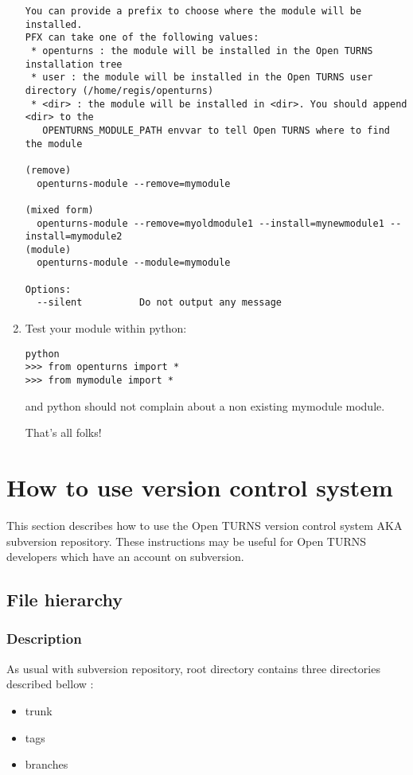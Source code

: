 \documentclass[11pt]{article}
\begin{document}
\begin{enumerate}
\begin{verbatim}
You can provide a prefix to choose where the module will be installed.
PFX can take one of the following values:
 * openturns : the module will be installed in the Open TURNS installation tree
 * user : the module will be installed in the Open TURNS user directory (/home/regis/openturns)
 * <dir> : the module will be installed in <dir>. You should append <dir> to the
   OPENTURNS_MODULE_PATH envvar to tell Open TURNS where to find the module

(remove)
  openturns-module --remove=mymodule

(mixed form)
  openturns-module --remove=myoldmodule1 --install=mynewmodule1 --install=mymodule2
(module)
  openturns-module --module=mymodule

Options:
  --silent          Do not output any message
\end{verbatim}
  \normalsize
\item Test your module within python:
\begin{verbatim}
python
>>> from openturns import *
>>> from mymodule import *
\end{verbatim}
  and python should not complain about a non existing mymodule module.

  That's all folks!

\end{enumerate}






\section{How to use version control system}

This section describes how to use the Open TURNS version control system AKA subversion repository. These instructions may be useful for Open TURNS developers which have an account on subversion.

\subsection{File hierarchy} 

\subsubsection{Description}

As usual with subversion repository, root directory contains three directories described bellow :
\begin{itemize}
  \item trunk
  \item tags
  \item branches 
\end{itemize}
\end{document}
